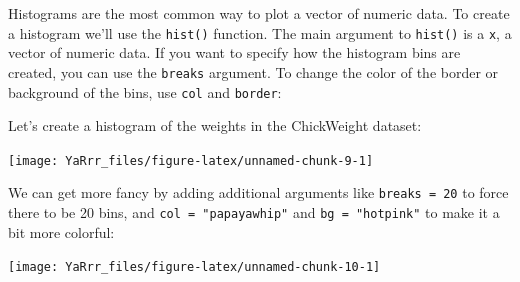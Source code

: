 \documentclass[]{book}
\newenvironment{Shaded}{\begin{snugshade}}{\end{snugshade}}
\newcommand{\KeywordTok}[1]{\textcolor[rgb]{0.13,0.29,0.53}{\textbf{{#1}}}}
\newcommand{\DataTypeTok}[1]{\textcolor[rgb]{0.13,0.29,0.53}{{#1}}}
\newcommand{\DecValTok}[1]{\textcolor[rgb]{0.00,0.00,0.81}{{#1}}}
\newcommand{\StringTok}[1]{\textcolor[rgb]{0.31,0.60,0.02}{{#1}}}
\newcommand{\CommentTok}[1]{\textcolor[rgb]{0.56,0.35,0.01}{\textit{{#1}}}}
\newcommand{\NormalTok}[1]{{#1}}
\theoremstyle{definition}
\theoremstyle{definition}
\theoremstyle{remark}
\begin{document}
Histograms are the most common way to plot a vector of numeric data. To
create a histogram we'll use the \texttt{hist()} function. The main
argument to \texttt{hist()} is a \texttt{x}, a vector of numeric data.
If you want to specify how the histogram bins are created, you can use
the \texttt{breaks} argument. To change the color of the border or
background of the bins, use \texttt{col} and \texttt{border}:

Let's create a histogram of the weights in the ChickWeight dataset:

\begin{Shaded}
\end{Shaded}

\begin{center}\texttt{[image: YaRrr\_files/figure-latex/unnamed-chunk-9-1]} \end{center}

We can get more fancy by adding additional arguments like
\texttt{breaks\ =\ 20} to force there to be 20 bins, and
\texttt{col\ =\ "papayawhip"} and \texttt{bg\ =\ "hotpink"} to make it a
bit more colorful:

\begin{Shaded}
\end{Shaded}

\begin{center}\texttt{[image: YaRrr\_files/figure-latex/unnamed-chunk-10-1]} \end{center}
\end{document}

